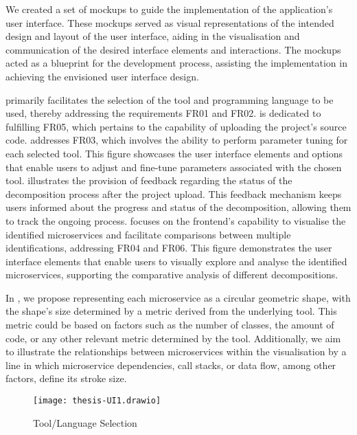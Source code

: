 We created a set of mockups to guide the implementation of the application's
user interface. These mockups served as visual representations of the intended
design and layout of the user interface, aiding in the visualisation and
communication of the desired interface elements and interactions. The mockups
acted as a blueprint for the development process, assisting the implementation
in achieving the envisioned user interface design.

 primarily facilitates the selection
of the tool and programming language to be used, thereby addressing the
requirements FR01 and FR02.  is
dedicated to fulfilling FR05, which pertains to the capability of uploading the
project's source code.  addresses FR03,
which involves the ability to perform parameter tuning for each selected tool.
This figure showcases the user interface elements and options that enable users
to adjust and fine-tune parameters associated with the chosen tool.
 illustrates the provision of feedback
regarding the status of the decomposition process after the project upload.
This feedback mechanism keeps users informed about the progress and status of
the decomposition, allowing them to track the ongoing process.
 focuses on the frontend's
capability to visualise the identified microservices and facilitate comparisons
between multiple identifications, addressing FR04 and FR06. This figure
demonstrates the user interface elements that enable users to visually explore
and analyse the identified microservices, supporting the comparative analysis
of different decompositions.

In , we propose representing each
microservice as a circular geometric shape, with the shape's size determined by
a metric derived from the underlying tool. This metric could be based on
factors such as the number of classes, the amount of code, or any other
relevant metric determined by the tool. Additionally, we aim to illustrate the
relationships between microservices within the visualisation by a line in which
microservice dependencies, call stacks, or data flow, among other factors,
define its stroke size.

\begin{figure*}[!htb]
  \centering
  \texttt{[image: thesis-UI1.drawio]}
  \caption{Tool/Language Selection}
  \label{fig:mockup-tool-language-selection}
\end{figure*}

